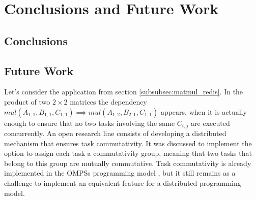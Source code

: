 \section{Conclusions and Future Work}
\subsection{Conclusions}
\label{subsec:conclusions}


\subsection{Future Work}
\label{subsec:future_work}

Let's consider the application from section \ref{subsubsec:matmul_redis}. In the product of two $2 \times 2$ matrices the dependency $mul(A_{1, 1}, B_{1, 1}, C_{1, 1}) \implies mul(A_{1,2}, B_{2, 1}, C_{1, 1})$ appears, when it is actually enough to ensure that no two tasks involving the same $C_{i, j}$ are executed concurrently. An open research line consists of developing a distributed mechanism that ensures task commutativity. It was discussed to implement the option to assign each task a commutativity group, meaning that two tasks that belong to this group are mutually commutative. Task commutativity is already implemented in the OMPSs programming model \cite{duran2011ompss}, but it still remains as a challenge to implement an equivalent feature for a distributed programming model. 



